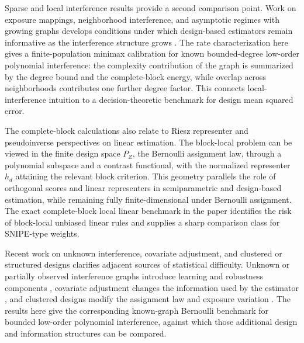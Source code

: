 Sparse and local interference results provide a second comparison point. Work on exposure mappings, neighborhood interference, and asymptotic regimes with growing graphs develops conditions under which design-based estimators remain informative as the interference structure grows \citep{Aronow2017,Athey2018,Baird2018,Basse2018a,Basse2018b,Jagadeesan2020,Savje2021,Leung2022,Hu2022,VazquezBare2023,Gao2025}. The rate characterization here gives a finite-population minimax calibration for known bounded-degree low-order polynomial interference: the complexity contribution of the graph is summarized by the degree bound and the complete-block energy, while overlap across neighborhoods contributes one further degree factor. This connects local-interference intuition to a decision-theoretic benchmark for design mean squared error.

The complete-block calculations also relate to Riesz representer and pseudoinverse perspectives on linear estimation. The block-local problem can be viewed in the finite design space \(P_Z\), the Bernoulli assignment law, through a polynomial subspace and a contrast functional, with the normalized representer \(h_d\) attaining the relevant block criterion. This geometry parallels the role of orthogonal scores and linear representers in semiparametric and design-based estimation, while remaining fully finite-dimensional under Bernoulli assignment. The exact complete-block local linear benchmark in the paper identifies the risk of block-local unbiased linear rules and supplies a sharp comparison class for SNIPE-type weights.

Recent work on unknown interference, covariate adjustment, and clustered or structured designs clarifies adjacent sources of statistical difficulty. Unknown or partially observed interference graphs introduce learning and robustness components \citep{YuAiroldiBorgsChayes2022,EichhornKhanUganderYu2026}, covariate adjustment changes the information used by the estimator \citep{Lin2013,WangLi2026}, and clustered designs modify the assignment law and exposure variation \citep{Basse2018a,Basse2018b,HarshawSavjeWang2025}. The results here give the corresponding known-graph Bernoulli benchmark for bounded low-order polynomial interference, against which those additional design and information structures can be compared.
